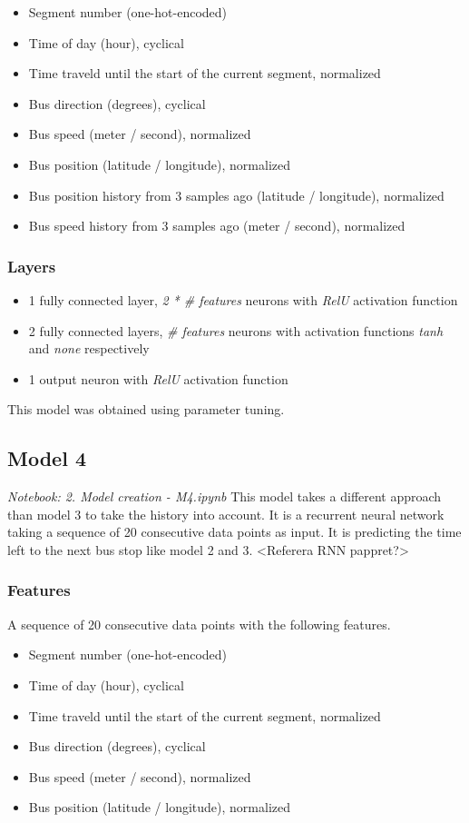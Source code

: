 \begin{itemize}
    \item Segment number (one-hot-encoded)
    \item Time of day (hour), cyclical
    \item Time traveld until the start of the current segment, normalized
    \item Bus direction (degrees), cyclical
    \item Bus speed (meter / second), normalized
    \item Bus position (latitude / longitude), normalized
    \item Bus position history from 3 samples ago (latitude / longitude), normalized
    \item Bus speed history from 3 samples ago (meter / second), normalized
\end{itemize}

\subsubsection{Layers}

\begin{itemize}
    \item 1 fully connected layer, \textit{2 * \# features} neurons with \textit{RelU} activation function
    \item 2 fully connected layers, \textit{\# features} neurons with activation functions \textit{tanh} and \textit{none} respectively
    \item 1 output neuron with \textit{RelU} activation function
\end{itemize}

This model was obtained using parameter tuning.

\subsection{Model 4}
\textit{Notebook: 2. Model creation - M4.ipynb}
\newline
\noindent This model takes a different approach than model 3 to take the history into account. It is a recurrent neural network taking a sequence of 20 consecutive data points as input. It is predicting the time left to the next bus stop like model 2 and 3. 
<Referera RNN pappret?>

\subsubsection{Features}
A sequence of 20 consecutive data points with the following features. 
\begin{itemize}
    \item Segment number (one-hot-encoded)
    \item Time of day (hour), cyclical
    \item Time traveld until the start of the current segment, normalized
    \item Bus direction (degrees), cyclical
    \item Bus speed (meter / second), normalized
    \item Bus position (latitude / longitude), normalized
\end{itemize}

